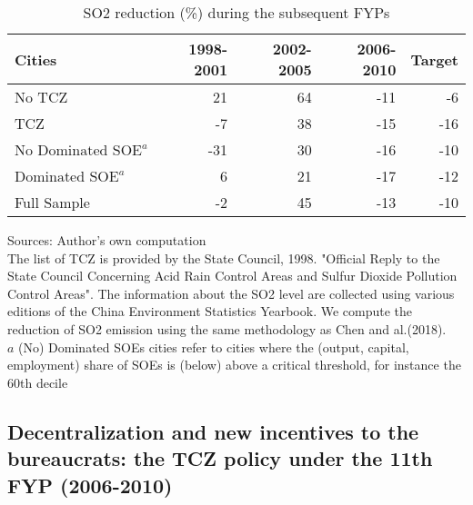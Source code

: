 \documentclass[12pt]{article}
\begin{document}
\begin{table}[!htb] \centering
\caption{\\ SO2 reduction (\%) during the subsequent FYPs}
\label{table_1}
\begin{adjustbox}{width=\textwidth, totalheight=\baselineskip,keepaspectratio}
\begin{tabular}{lrrrr}
\toprule
             Cities &  1998-2001 &  2002-2005 &  2006-2010 &  Target \\
\midrule
             No TCZ &     21 &     64 &    -11 &  -6 \\
                TCZ &     -7 &     38 &    -15 & -16 \\
 $\text{No Dominated SOE}^ a$ &    -31 &     30 &    -16 & -10 \\
 $\text{Dominated SOE}^ a$ &      6 &     21 &    -17 & -12 \\
        Full Sample &     -2 &     45 &    -13 & -10 \\
\bottomrule
\end{tabular}
\end{adjustbox}
\begin{tablenotes} 
 \small 
 \item 
Sources: Author's own computation \\
The list of TCZ is provided by the State Council, 1998.
"Official Reply to the State Council Concerning Acid Rain Control Areas
and Sulfur Dioxide Pollution Control Areas".
The information about the SO2 level are collected using various editions
of the China Environment Statistics Yearbook.
We compute the reduction of SO2 emission using the same methodology
as Chen and al.(2018). \\
$a$ (No) Dominated SOEs cities refer to cities where the 
(output, capital, employment) share of SOEs is (below) above a critical threshold, for instance the 60th decile
 
\end{tablenotes}
\end{table}

\subsection{Decentralization and new incentives to the bureaucrats: the TCZ policy under the 11th FYP (2006-2010)}
\end{document}
